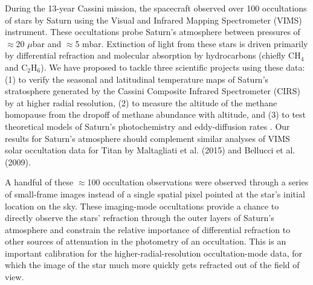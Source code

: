 \documentclass[12pt]{article}
\begin{document}
During the 13-year Cassini mission, the spacecraft observed over 100
occultations of stars by Saturn using the Visual and Infrared Mapping
Spectrometer (VIMS) instrument. These occultations probe Saturn’s atmosphere
between pressures of $\approx$20 $\mu$bar and $\approx$5 mbar. Extinction of light from these stars
is driven primarily by differential refraction and molecular absorption by
hydrocarbons (chiefly CH$_4$ and C$_2$H$_6$). We have proposed to tackle three
scientific projects using these data: (1) to verify the seasonal and
latitudinal temperature maps of Saturn’s stratosphere generated by the Cassini
Composite Infrared Spectrometer (CIRS) by \citealp{Fletcher07} at higher
radial resolution, (2) to measure the altitude of the methane homopause from
the dropoff of methane abundance with altitude, and (3) to test theoretical
models of Saturn's photochemistry and eddy-diffusion rates \citep{Moses05}. Our
results for Saturn's atmosphere should complement similar analyses of VIMS
solar occultation data for Titan by Maltagliati et al.  (2015) and Bellucci et
al. (2009).

A handful of these $\approx$100 occultation observations were observed through
a series of small-frame images instead of a single spatial pixel pointed at the
star's initial location on the sky.  These imaging-mode occultations provide a
chance to directly observe the stars' refraction through the outer layers of
Saturn's atmosphere and constrain the relative importance of differential
refraction to other sources of attenuation in the photometry of an occultation.
This is an important calibration for the higher-radial-resolution
occultation-mode data, for which the image of the star much more quickly gets
refracted out of the field of view.
\end{document}
